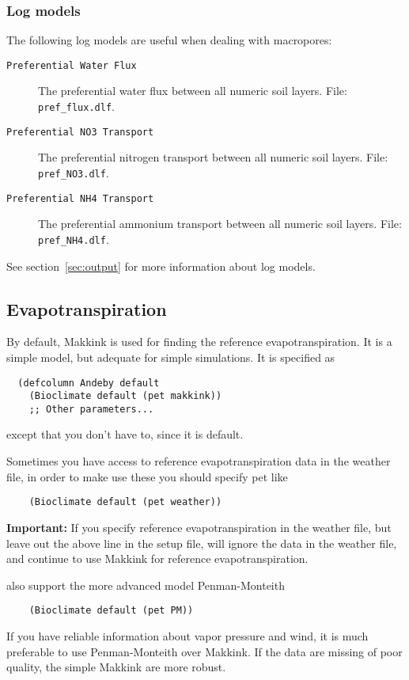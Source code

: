 \documentclass[a4paper,11pt]{article}
\begin{document}
\subsubsection{Log models}

The following log models are useful when dealing with macropores:
\begin{description}
\item[\texttt{Preferential Water Flux}] The preferential water flux
  between all numeric soil layers.  File: \texttt{pref\_flux.dlf}.
\item[\texttt{Preferential NO3 Transport}] The preferential nitrogen
  transport between all numeric soil layers.  File:
  \texttt{pref\_NO3.dlf}.
\item[\texttt{Preferential NH4 Transport}] The preferential ammonium
  transport between all numeric soil layers.  File:
  \texttt{pref\_NH4.dlf}.
\end{description}
See section~\ref{sec:output} for more information about log models. 

\subsection{Evapotranspiration}
\label{sec:bioclimate}

By default, Makkink is used for finding the reference
evapotranspiration.  It is a simple model, but adequate for simple
simulations.  It is specified as
\begin{verbatim}
  (defcolumn Andeby default
    (Bioclimate default (pet makkink))
    ;; Other parameters...
\end{verbatim}
except that you don't have to, since it is default.

Sometimes you have access to reference evapotranspiration data in the
weather file, in order to make \daisy{} use these you should specify
pet like
\begin{verbatim}
    (Bioclimate default (pet weather))
\end{verbatim}
\textbf{Important:}  If you specify reference evapotranspiration in
the weather file, but leave out the above line in the \daisy{} setup
file, \daisy{} will ignore the data in the weather file, and continue
to use Makkink for reference evapotranspiration.

\Daisy{} also support the more advanced model Penman-Monteith
\begin{verbatim}
    (Bioclimate default (pet PM))
\end{verbatim}
If you have reliable information about vapor pressure and wind, it is
much preferable to use Penman-Monteith over Makkink.  If the data are
missing of poor quality, the simple Makkink are more robust.
\end{document}
